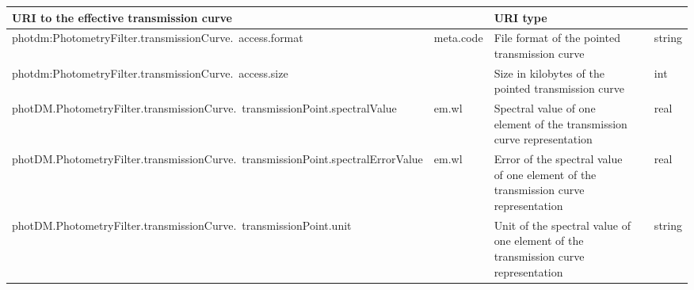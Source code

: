 \documentclass[11pt,a4paper]{ivoa}
\begin{document}
\begin{appendices}
\begin{table}[H]
\begin{adjustbox}{angle=90}
\begin{tabular}{p{2.5in}|p{1.5in}|p{2in}|p{0.74in}|p{0.35in}}
\multicolumn{1}{p{2in}}{{\fontsize{8pt}{8pt}\selectfont URI to the
effective transmission curve}} &
\multicolumn{1}{p{0.74in}}{} &
\multicolumn{1}{p{0.35in}}{{\fontsize{8pt}{8pt}\selectfont URI type}} \\
\hline
\multicolumn{1}{p{2.5in}}{{\fontsize{8pt}{8pt}
\selectfont photdm:PhotometryFilter.transmissionCurve.\ access.format}} &
\multicolumn{1}{p{1.5in}}{{\fontsize{8pt}{8pt}\selectfont meta.code}} &
\multicolumn{1}{p{2in}}{{\fontsize{8pt}{8pt}\selectfont File format of the pointed transmission curve}} &
\multicolumn{1}{p{0.74in}}{} &
\multicolumn{1}{p{0.35in}}{{\fontsize{8pt}{8pt}\selectfont string}} \\
\hline
\multicolumn{1}{p{2.5in}}{{\fontsize{8pt}{8pt}
\selectfont photdm:PhotometryFilter.transmissionCurve.\ access.size}} &
\multicolumn{1}{p{1.5in}}{{\fontsize{8pt}{8pt}\selectfont }} &
\multicolumn{1}{p{2in}}{{\fontsize{8pt}{8pt}\selectfont Size in kilobytes of the pointed transmission curve}} &
\multicolumn{1}{p{0.74in}}{} &
\multicolumn{1}{p{0.35in}}{{\fontsize{8pt}{8pt}\selectfont int}} \\
\hline
\multicolumn{1}{p{2.5in}}{{\fontsize{8pt}{8pt}
\selectfont photDM.PhotometryFilter.transmissionCurve.\ transmissionPoint.spectralValue}} &
\multicolumn{1}{p{1.5in}}{{\fontsize{8pt}{8pt}\selectfont em.wl}} &
\multicolumn{1}{p{2in}}{{\fontsize{8pt}{8pt}\selectfont Spectral value
of one element of the transmission curve representation}} &
\multicolumn{1}{p{0.74in}}{} &
\multicolumn{1}{p{0.35in}}{{\fontsize{8pt}{8pt}\selectfont real}} \\
\hline
\multicolumn{1}{p{2.5in}}{{\fontsize{8pt}{8pt}
\selectfont photDM.PhotometryFilter.transmissionCurve.\ transmissionPoint.spectralErrorValue}} &
\multicolumn{1}{p{1.5in}}{{\fontsize{8pt}{8pt}\selectfont em.wl}} &
\multicolumn{1}{p{2in}}{{\fontsize{8pt}{8pt}\selectfont Error of the spectral value
of one element of the transmission curve representation}} &
\multicolumn{1}{p{0.74in}}{} &
\multicolumn{1}{p{0.35in}}{{\fontsize{8pt}{8pt}\selectfont real}} \\
\hline
\multicolumn{1}{p{2.5in}}{{\fontsize{8pt}{8pt}
\selectfont photDM.PhotometryFilter.transmissionCurve.\ transmissionPoint.unit}} &
\multicolumn{1}{p{1.5in}}{{\fontsize{8pt}{8pt}\selectfont }} &
\multicolumn{1}{p{2in}}{{\fontsize{8pt}{8pt}\selectfont Unit of the spectral value
of one element of the transmission curve representation}} &
\multicolumn{1}{p{0.74in}}{} &
\multicolumn{1}{p{0.35in}}{{\fontsize{8pt}{8pt}\selectfont string}} \\

\end{tabular}
\end{adjustbox}
\end{table}
\end{appendices}
\end{document}
